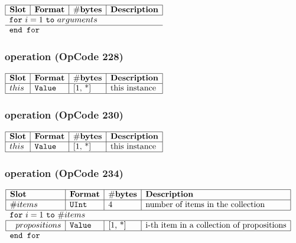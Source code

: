\noindent
\(\begin{array}{| l | l | l | l |}
    \hline
    \bf{Slot} & \bf{Format} & \bf{\#bytes} & \bf{Description} \\
    \hline
        \multicolumn{4}{l}{\lst{for}~i=1~\lst{to}~arguments} \\
    \hline
             \multicolumn{4}{l}{\lst{end for}} \\
\end{array}\)
       

\subsubsection{ operation (OpCode 228)}

\noindent
\(\begin{array}{| l | l | l | l |}
    \hline
    \bf{Slot} & \bf{Format} & \bf{\#bytes} & \bf{Description} \\
    \hline
         this & \lst{Value} & \text{[1, *]} & \text{this instance} \\
    \hline
      
\end{array}\)
       

\subsubsection{ operation (OpCode 230)}

\noindent
\(\begin{array}{| l | l | l | l |}
    \hline
    \bf{Slot} & \bf{Format} & \bf{\#bytes} & \bf{Description} \\
    \hline
         this & \lst{Value} & \text{[1, *]} & \text{this instance} \\
    \hline
      
\end{array}\)
       

\subsubsection{ operation (OpCode 234)}

\noindent
\(\begin{array}{| l | l | l | l |}
    \hline
    \bf{Slot} & \bf{Format} & \bf{\#bytes} & \bf{Description} \\
    \hline
         \#items & \lst{UInt} & \text{4} & \text{number of items in the collection} \\
    \hline
          \multicolumn{4}{l}{\lst{for}~i=1~\lst{to}~\#items} \\
    \hline
             ~~ propositions & \lst{Value} & \text{[1, *]} & \text{i-th item in a collection of propositions} \\
    \hline
          \multicolumn{4}{l}{\lst{end for}} \\
\end{array}\)
       

